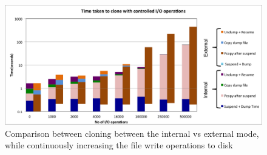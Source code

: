 \begin{figure}[t]
	\begin{center}
		\includegraphics[width=1\textwidth]{figs/fioResult.png}
		\caption{Comparison between cloning between the internal vs external mode, while continuously increasing the file write operations to disk}
		\label{fig:fioResults}
	\end{center}
\end{figure}
\fi

